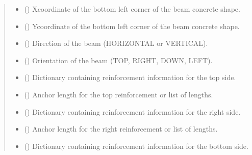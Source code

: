 \documentclass[a4paper,10pt,english]{sphinxmanual}
\begin{document}
\begin{fulllineitems}
\begin{quote}
\begin{description}
\begin{itemize}
\item {} 
\sphinxAtStartPar
{} () \textendash{} X\sphinxhyphen{}coordinate of the bottom left corner of the beam concrete shape.

\item {} 
\sphinxAtStartPar
{} () \textendash{} Y\sphinxhyphen{}coordinate of the bottom left corner of the beam concrete shape.

\item {} 
\sphinxAtStartPar
{} () \textendash{} Direction of the beam (HORIZONTAL or VERTICAL).

\item {} 
\sphinxAtStartPar
{} () \textendash{} Orientation of the beam (TOP, RIGHT, DOWN, LEFT).

\item {} 
\sphinxAtStartPar
{} () \textendash{} Dictionary containing reinforcement information for the top side.

\item {} 
\sphinxAtStartPar
{} (\sphinxstyleliteralemphasis{\sphinxupquote{ | }}) \textendash{} Anchor length for the top reinforcement or list of lengths.

\item {} 
\sphinxAtStartPar
{} () \textendash{} Dictionary containing reinforcement information for the right side.

\item {} 
\sphinxAtStartPar
{} (\sphinxstyleliteralemphasis{\sphinxupquote{ | }}) \textendash{} Anchor length for the right reinforcement or list of lengths.

\item {} 
\sphinxAtStartPar
{} () \textendash{} Dictionary containing reinforcement information for the bottom side.


\end{itemize}
\end{description}
\end{quote}
\end{fulllineitems}
\end{document}
